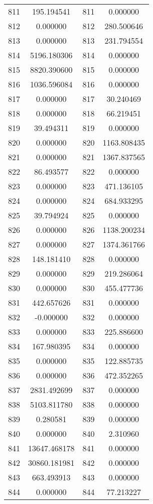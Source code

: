 \documentclass[12pt]{article}
\begin{document}
\begin{longtable}{@{}cccc@{}}
811 & 195.194541 & 811 & 0.000000 \\
812 & 0.000000 & 812 & 280.500646 \\
813 & 0.000000 & 813 & 231.794554 \\
814 & 5196.180306 & 814 & 0.000000 \\
815 & 8820.390600 & 815 & 0.000000 \\
816 & 1036.596084 & 816 & 0.000000 \\
817 & 0.000000 & 817 & 30.240469 \\
818 & 0.000000 & 818 & 66.219451 \\
819 & 39.494311 & 819 & 0.000000 \\
820 & 0.000000 & 820 & 1163.808435 \\
821 & 0.000000 & 821 & 1367.837565 \\
822 & 86.493577 & 822 & 0.000000 \\
823 & 0.000000 & 823 & 471.136105 \\
824 & 0.000000 & 824 & 684.933295 \\
825 & 39.794924 & 825 & 0.000000 \\
826 & 0.000000 & 826 & 1138.200234 \\
827 & 0.000000 & 827 & 1374.361766 \\
828 & 148.181410 & 828 & 0.000000 \\
829 & 0.000000 & 829 & 219.286064 \\
830 & 0.000000 & 830 & 455.477736 \\
831 & 442.657626 & 831 & 0.000000 \\
832 & -0.000000 & 832 & 0.000000 \\
833 & 0.000000 & 833 & 225.886600 \\
834 & 167.980395 & 834 & 0.000000 \\
835 & 0.000000 & 835 & 122.885735 \\
836 & 0.000000 & 836 & 472.352265 \\
837 & 2831.492699 & 837 & 0.000000 \\
838 & 5103.811780 & 838 & 0.000000 \\
839 & 0.280581 & 839 & 0.000000 \\
840 & 0.000000 & 840 & 2.310960 \\
841 & 13647.468178 & 841 & 0.000000 \\
842 & 30860.181981 & 842 & 0.000000 \\
843 & 663.493913 & 843 & 0.000000 \\
844 & 0.000000 & 844 & 77.213227 \\

\end{longtable}
\end{document}
